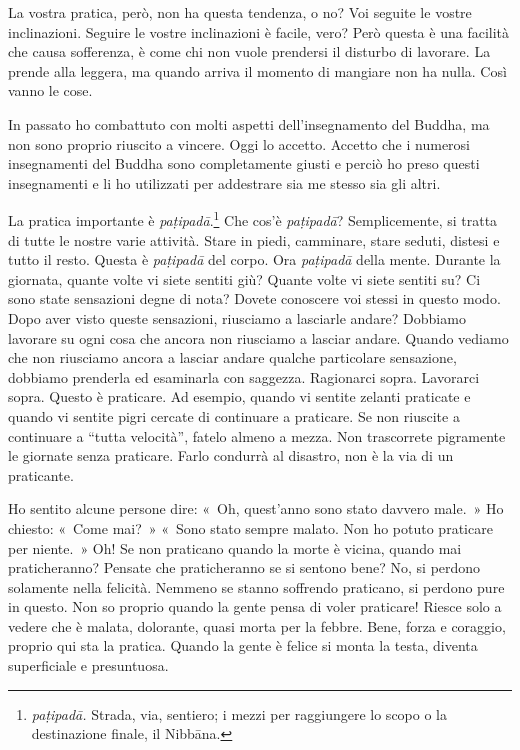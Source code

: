 La vostra pratica, però, non ha questa tendenza, o no? Voi seguite le
vostre inclinazioni. Seguire le vostre inclinazioni è facile, vero? Però
questa è una facilità che causa sofferenza, è come chi non vuole
prendersi il disturbo di lavorare. La prende alla leggera, ma quando
arriva il momento di mangiare non ha nulla. Così vanno le cose.

In passato ho combattuto con molti aspetti dell'insegnamento del Buddha,
ma non sono proprio riuscito a vincere. Oggi lo accetto. Accetto che i
numerosi insegnamenti del Buddha sono completamente giusti e perciò ho
preso questi insegnamenti e li ho utilizzati per addestrare sia me
stesso sia gli altri.

La pratica importante è \emph{paṭipadā}.\footnote{\emph{paṭipadā.}
  Strada, via, sentiero; i mezzi per raggiungere lo scopo o la
  destinazione finale, il Nibbāna.} Che cos'è \emph{paṭipadā}?
Semplicemente, si tratta di tutte le nostre varie attività. Stare in
piedi, camminare, stare seduti, distesi e tutto il resto. Questa è
\emph{paṭipadā} del corpo. Ora \emph{paṭipadā} della mente. Durante la
giornata, quante volte vi siete sentiti giù? Quante volte vi siete
sentiti su? Ci sono state sensazioni degne di nota? Dovete conoscere voi
stessi in questo modo. Dopo aver visto queste sensazioni, riusciamo a
lasciarle andare? Dobbiamo lavorare su ogni cosa che ancora non
riusciamo a lasciar andare. Quando vediamo che non riusciamo ancora a
lasciar andare qualche particolare sensazione, dobbiamo prenderla ed
esaminarla con saggezza. Ragionarci sopra. Lavorarci sopra. Questo è
praticare. Ad esempio, quando vi sentite zelanti praticate e quando vi
sentite pigri cercate di continuare a praticare. Se non riuscite a
continuare a ``tutta velocità'', fatelo almeno a mezza. Non trascorrete
pigramente le giornate senza praticare. Farlo condurrà al disastro, non
è la via di un praticante.

Ho sentito alcune persone dire: «~Oh, quest'anno sono stato davvero
male.~» Ho chiesto: «~Come mai?~» «~Sono stato sempre malato. Non ho
potuto praticare per niente.~» Oh! Se non praticano quando la morte è
vicina, quando mai praticheranno? Pensate che praticheranno se si
sentono bene? No, si perdono solamente nella felicità. Nemmeno se stanno
soffrendo praticano, si perdono pure in questo. Non so proprio quando la
gente pensa di voler praticare! Riesce solo a vedere che è malata,
dolorante, quasi morta per la febbre. Bene, forza e coraggio, proprio
qui sta la pratica. Quando la gente è felice si monta la testa, diventa
superficiale e presuntuosa.

